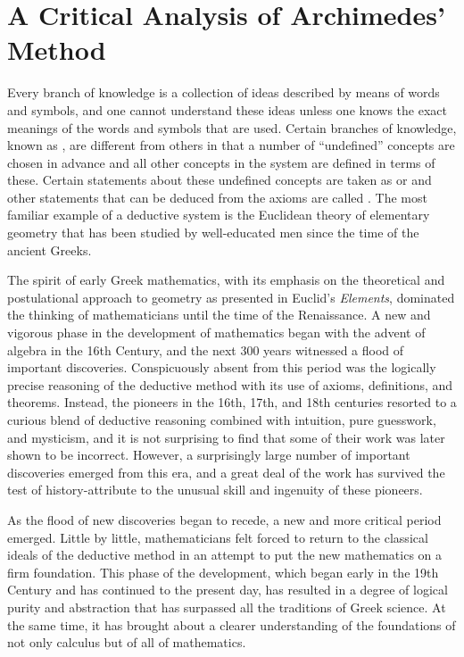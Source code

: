 \section{A Critical Analysis of Archimedes' Method}\label{sec:1.1.5}

\begin{note}
  Every branch of knowledge is a collection of ideas described by means of words and symbols, and one cannot understand these ideas unless one knows the exact meanings of the words and symbols that are used.
  Certain branches of knowledge, known as \textbf{}, are different from others in that a number of ``undefined'' concepts are chosen in advance and all other concepts in the system are defined in terms of these.
  Certain statements about these undefined concepts are taken as \textbf{} or \textbf{} and other statements that can be deduced from the axioms are called \textbf{}.
  The most familiar example of a deductive system is the Euclidean theory of elementary geometry that has been studied by well-educated men since the time of the ancient Greeks.

  The spirit of early Greek mathematics, with its emphasis on the theoretical and postulational approach to geometry as presented in Euclid's \emph{Elements}, dominated the thinking of mathematicians until the time of the Renaissance.
  A new and vigorous phase in the development of mathematics began with the advent of algebra in the 16th Century, and the next 300 years witnessed a flood of important discoveries.
  Conspicuously absent from this period was the logically precise reasoning of the deductive method with its use of axioms, definitions, and theorems.
  Instead, the pioneers in the 16th, 17th, and 18th centuries resorted to a curious blend of deductive reasoning combined with intuition, pure guesswork, and mysticism, and it is not surprising to find that some of their work was later shown to be incorrect.
  However, a surprisingly large number of important discoveries emerged from this era, and a great deal of the work has survived the test of history-attribute to the unusual skill and ingenuity of these pioneers.

  As the flood of new discoveries began to recede, a new and more critical period emerged.
  Little by little, mathematicians felt forced to return to the classical ideals of the deductive method in an attempt to put the new mathematics on a firm foundation.
  This phase of the development, which began early in the 19th Century and has continued to the present day, has resulted in a degree of logical purity and abstraction that has surpassed all the traditions of Greek science.
  At the same time, it has brought about a clearer understanding of the foundations of not only calculus but of all of mathematics.


\end{note}
